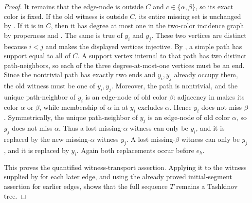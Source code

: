 \begin{proof}
It remains that the edge-node is outside \(C\) and
\(c\in\{\alpha,\beta\}\), so its exact color is fixed.  If the old
witness is outside \(C\), its entire missing set is unchanged by
.  If it is in \(C\),
then it has degree at most one in the two-color incidence graph by
properness and .  The same is
true of \(y_i\) and \(y_j\).  These two vertices are distinct because
\(i<j\) and  makes the displayed vertices
injective.  By , a simple path
has support equal to all of \(C\).  A support vertex internal to that
path has two distinct path-neighbors, so each of the three
degree-at-most-one vertices must be an end.  Since the nontrivial path
has exactly two ends and \(y_i,y_j\) already occupy them, the old
witness must be one of \(y_i,y_j\).  Moreover, the path is nontrivial,
and the unique path-neighbor of \(y_i\) is an edge-node of old color
\(\beta\): adjacency
in  makes its color \(\alpha\) or
\(\beta\), while membership of \(\alpha\) in
 at \(y_i\) excludes \(\alpha\).  Hence \(y_i\)
does not miss \(\beta\).  Symmetrically, the unique path-neighbor of
\(y_j\) is an edge-node of old color \(\alpha\), so \(y_j\) does not
miss \(\alpha\).  Thus a lost missing-\(\alpha\) witness can only be
\(y_i\), and it is replaced by the new missing-\(\alpha\) witness
\(y_j\).  A lost missing-\(\beta\) witness can only be \(y_j\), and it
is replaced by \(y_i\).  Again both replacements occur before \(e_h\).

This proves the quantified witness-transport assertion.  Applying it to
the witness supplied by  for each later edge, and
using the already proved initial-segment assertion for earlier edges,
shows that the full sequence \(T\) remains a Tashkinov tree.
\end{proof}
